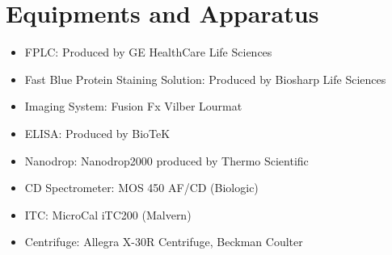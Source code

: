 \documentclass{report}
\begin{document}
\chapter{Equipments and Apparatus}
\begin{itemize}
    \item FPLC: Produced by GE HealthCare Life Sciences
    \item Fast Blue Protein Staining Solution: Produced by Biosharp Life Sciences
    \item Imaging System: Fusion Fx Vilber Lourmat
    \item ELISA: Produced by BioTeK
    \item Nanodrop: Nanodrop2000 produced by Thermo Scientific
    \item CD Spectrometer: MOS 450 AF/CD (Biologic)
    \item ITC: MicroCal iTC200 (Malvern)
    \item Centrifuge: Allegra X-30R Centrifuge, Beckman Coulter

\end{itemize}


\end{document}
